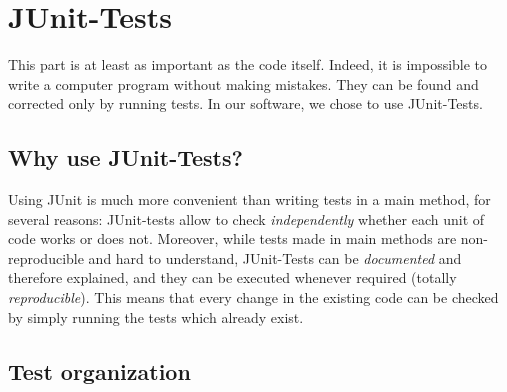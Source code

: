 \section{JUnit-Tests}
This part is at least as important as the code itself. Indeed, it is impossible to write a computer program without making mistakes. They can be found and corrected only by running tests. In our software, we chose to use JUnit-Tests.

\subsection{Why use JUnit-Tests?}
\label{sub:why_use_JUnih-Tests}

Using JUnit is much more convenient than writing tests in a main method, for several reasons: JUnit-tests allow to check \textit{independently} whether each unit of code works or does not. Moreover, while tests made in main methods are non-reproducible and hard to understand, JUnit-Tests can be \textit{documented} and therefore explained, and they can be executed whenever required (totally \textit{reproducible}). This means that every change in the existing code can be checked by simply running the tests which already exist.

\subsection{Test organization}
\label{sub:test_organisation}

